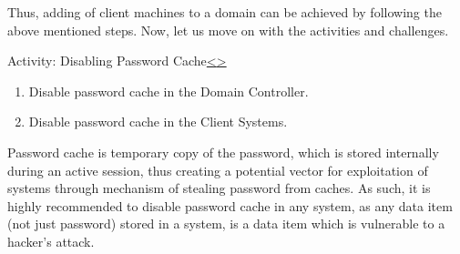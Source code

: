 \documentclass[12pt]{extarticle}
\newenvironment{instructionblock}{\Large\bgroup}{\egroup}
\begin{document}
\noindent
Thus, adding of client machines to a domain can be achieved by following the above mentioned steps. Now, let us move on with the activities and challenges.




\pagebreak
\begin{slide}{Activity: Disabling Password Cache}{\hyperref[slide 13]{\textless}\hyperref[slide 15]{\textgreater}}
\vskip 5pt
\begin{instructionblock}
\begin{enumerate}
\item Disable password cache in the Domain Controller.
\item Disable password cache in the Client Systems.
\end{enumerate}

\end{instructionblock}
\end{slide}

\vspace{2mm}
\noindent
Password cache is temporary copy of the password, which is stored internally during an active session, thus creating a potential vector for exploitation of systems through mechanism of stealing password from caches. As such, it is highly recommended to disable password cache in any system, as any data item (not just password) stored in a system, is a data item which is vulnerable to a hacker's attack.  
\end{document}
